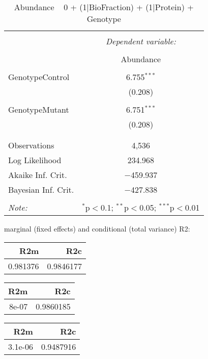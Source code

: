 \documentclass[11pt]{report}
\begin{document}
\begin{table}[!htbp] \centering 
  \caption{Abundance ~ 0 + (1|BioFraction) + (1|Protein) + Genotype} 
  \label{} 
\begin{tabular}{@{\extracolsep{5pt}}lc} 
\\[-1.8ex]\hline 
\hline \\[-1.8ex] 
 & \multicolumn{1}{c}{\textit{Dependent variable:}} \\ 
\cline{2-2} 
\\[-1.8ex] & Abundance \\ 
\hline \\[-1.8ex] 
 GenotypeControl & 6.755$^{***}$ \\ 
  & (0.208) \\ 
  & \\ 
 GenotypeMutant & 6.751$^{***}$ \\ 
  & (0.208) \\ 
  & \\ 
\hline \\[-1.8ex] 
Observations & 4,536 \\ 
Log Likelihood & 234.968 \\ 
Akaike Inf. Crit. & $-$459.937 \\ 
Bayesian Inf. Crit. & $-$427.838 \\ 
\hline 
\hline \\[-1.8ex] 
\textit{Note:}  & \multicolumn{1}{r}{$^{*}$p$<$0.1; $^{**}$p$<$0.05; $^{***}$p$<$0.01} \\ 
\end{tabular} 
\end{table} 
marginal (fixed effects) and conditional (total variance) R2:

\begin{tabular}{r|r}
\hline
R2m & R2c\\
\hline
0.981376 & 0.9846177\\
\hline
\end{tabular}

\begin{tabular}{r|r}
\hline
R2m & R2c\\
\hline
8e-07 & 0.9860185\\
\hline
\end{tabular}

\begin{tabular}{r|r}
\hline
R2m & R2c\\
\hline
3.1e-06 & 0.9487916\\
\hline
\end{tabular}
\end{document}
